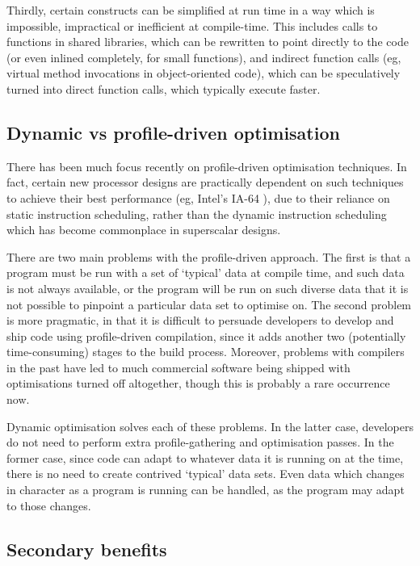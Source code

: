 Thirdly, certain constructs can be simplified at run time in a way
which is impossible, impractical or inefficient at compile-time. This
includes calls to functions in shared libraries, which can be rewritten
to point directly to the code (or even inlined completely, for small
functions), and indirect function calls (eg, virtual method invocations in
object-oriented code), which can be speculatively turned into direct function calls, which typically execute faster.


\subsection{Dynamic vs profile-driven optimisation}

There has been much focus recently on profile-driven optimisation
techniques. In fact, certain new processor designs are practically
dependent on such techniques to achieve their best performance (eg,
Intel's IA-64 \cite{Hazelwood}), due to their reliance on static
instruction scheduling, rather than the dynamic instruction scheduling
which has become commonplace in superscalar designs.

There are two main problems with the profile-driven approach. The
first is that a program must be run with a set of `typical' data at
compile time, and such data is not always available, or the program
will be run on such diverse data that it is not possible to pinpoint
a particular data set to optimise on. The second problem is more pragmatic,
in that it is difficult to persuade developers to develop and ship
code using profile-driven compilation, since it adds another two (potentially
time-consuming) stages to the build process. Moreover, problems with
compilers in the past have led to much commercial software being shipped
with optimisations turned off altogether, though this is probably a rare occurrence now.

Dynamic optimisation solves each of these problems. In the latter
case, developers do not need to perform extra profile-gathering and
optimisation passes. In the former case, since code can adapt to whatever
data it is running on at the time, there is no need to create contrived
`typical' data sets. Even data which changes in character as a program
is running can be handled, as the program may adapt to those changes.


\subsection{Secondary benefits}

